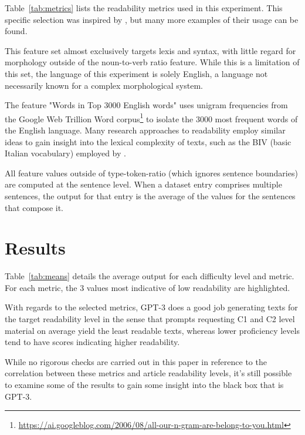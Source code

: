 \documentclass[11pt]{article}
\begin{document}


Table~\ref{tab:metrics} lists the readability metrics used in this experiment. This specific selection was inspired by \citep{venturi-etal-2015-nlp}, but many more examples of their usage can be found. 

This feature set almost exclusively targets lexis and syntax, with little regard for morphology outside of the noun-to-verb ratio feature. While this is a limitation of this set, the language of this experiment is solely English, a language not necessarily known for a complex morphological system.

The feature "Words in Top 3000 English words" uses unigram frequencies from the Google Web Trillion Word corpus\footnote{\url{https://ai.googleblog.com/2006/08/all-our-n-gram-are-belong-to-you.html}} to isolate the 3000 most frequent words of the English language. Many research approaches to readability employ similar ideas to gain insight into the lexical complexity of texts, such as the BIV (basic Italian vocabulary) employed by \citep{dellorletta-etal-2011-read}.

All feature values outside of type-token-ratio (which ignores sentence boundaries) are computed at the sentence level. When a dataset entry comprises multiple sentences, the output for that entry is the average of the values for the sentences that compose it. 

\section{Results}



Table~\ref{tab:means} details the average output for each difficulty level and metric. For each metric, the 3 values most indicative of low readability are highlighted.

With regards to the selected metrics, GPT-3 does a good job generating texts for the target readability level in the sense that prompts requesting C1 and C2 level material on average yield the least readable texts, whereas lower proficiency levels tend to have scores indicating higher readability.
 
While no rigorous checks are carried out in this paper in reference to the correlation between these metrics and article readability levels, it's still possible to examine some of the results to gain some insight into the black box that is GPT-3.


\end{document}
